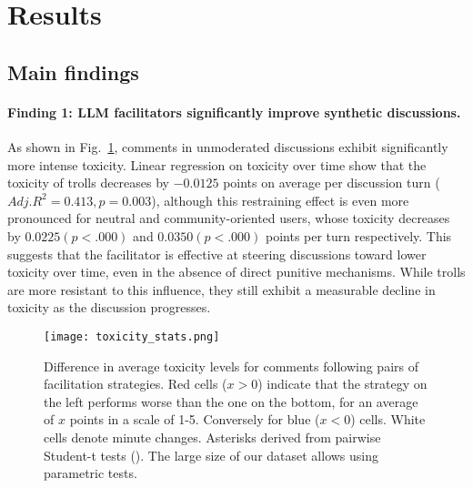 %

\section{Results}
\label{sec:results}


\subsection{Main findings}
\label{ssec:results:main}

\paragraph{Finding 1: LLM facilitators significantly improve synthetic discussions.} As shown in Fig.~\ref{fig:toxicity_stats}, comments in unmoderated discussions exhibit significantly more intense toxicity. Linear regression on toxicity over time show that the toxicity of trolls decreases by $\minus0.0125$ points on average per discussion turn ($Adj. R^2= 0.413, p=0.003$), although this restraining effect is even more pronounced for neutral and community-oriented users, whose toxicity decreases by $0.0225 (p <.000)$  and $0.0350 (p <.000)$ points per turn respectively. This suggests that the facilitator is effective at steering discussions toward lower toxicity over time, even in the absence of direct punitive mechanisms. While trolls are more resistant to this influence, they still exhibit a measurable decline in toxicity as the discussion progresses.

\begin{figure}
	\texttt{[image: toxicity\_stats.png]}
	\centering
	\caption{Difference in average toxicity levels for comments following pairs of facilitation strategies. Red cells ($x>0$) indicate that the strategy on the left performs worse than the one on the bottom, for an average of $x$ points in a scale of 1-5. Conversely for blue ($x<0$) cells. White cells denote minute changes. Asterisks derived from pairwise Student-t tests (\asterisknote). The large size of our dataset allows using parametric tests.}
	\label{fig:toxicity_stats}
\end{figure}


